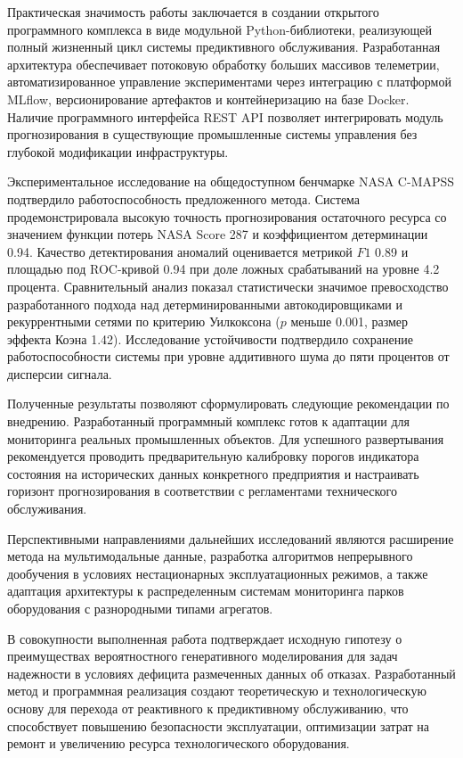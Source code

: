 \documentclass[14pt, a4paper, oneside]{extreport}
\begin{document}
Практическая значимость работы заключается в создании открытого программного комплекса в виде модульной Python-библиотеки, реализующей полный жизненный цикл системы предиктивного обслуживания. Разработанная архитектура обеспечивает потоковую обработку больших массивов телеметрии, автоматизированное управление экспериментами через интеграцию с платформой MLflow, версионирование артефактов и контейнеризацию на базе Docker. Наличие программного интерфейса REST API позволяет интегрировать модуль прогнозирования в существующие промышленные системы управления без глубокой модификации инфраструктуры.

Экспериментальное исследование на общедоступном бенчмарке NASA C-MAPSS подтвердило работоспособность предложенного метода. Система продемонстрировала высокую точность прогнозирования остаточного ресурса со значением функции потерь NASA Score 287 и коэффициентом детерминации 0.94. Качество детектирования аномалий оценивается метрикой $F1$ 0.89 и площадью под ROC-кривой 0.94 при доле ложных срабатываний на уровне 4.2 процента. Сравнительный анализ показал статистически значимое превосходство разработанного подхода над детерминированными автокодировщиками и рекуррентными сетями по критерию Уилкоксона ($p$ меньше 0.001, размер эффекта Коэна 1.42). Исследование устойчивости подтвердило сохранение работоспособности системы при уровне аддитивного шума до пяти процентов от дисперсии сигнала.

Полученные результаты позволяют сформулировать следующие рекомендации по внедрению. Разработанный программный комплекс готов к адаптации для мониторинга реальных промышленных объектов. Для успешного развертывания рекомендуется проводить предварительную калибровку порогов индикатора состояния на исторических данных конкретного предприятия и настраивать горизонт прогнозирования в соответствии с регламентами технического обслуживания.

Перспективными направлениями дальнейших исследований являются расширение метода на мультимодальные данные, разработка алгоритмов непрерывного дообучения в условиях нестационарных эксплуатационных режимов, а также адаптация архитектуры к распределенным системам мониторинга парков оборудования с разнородными типами агрегатов.

В совокупности выполненная работа подтверждает исходную гипотезу о преимуществах вероятностного генеративного моделирования для задач надежности в условиях дефицита размеченных данных об отказах. Разработанный метод и программная реализация создают теоретическую и технологическую основу для перехода от реактивного к предиктивному обслуживанию, что способствует повышению безопасности эксплуатации, оптимизации затрат на ремонт и увеличению ресурса технологического оборудования.
\end{document}
